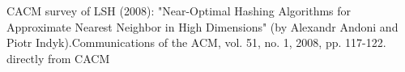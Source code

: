 \documentclass[letterpaper]{article}
\begin{document}
CACM survey of LSH (2008): "Near-Optimal Hashing Algorithms for Approximate Nearest Neighbor in High Dimensions" (by Alexandr Andoni and Piotr Indyk).Communications of the ACM, vol. 51, no. 1, 2008, pp. 117-122. 
directly from CACM 


%

\end{document}
